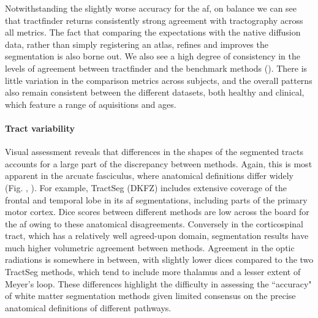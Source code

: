 Notwithstanding the slightly worse accuracy for the \gls{af}, on balance we can see that tractfinder returns consistently strong agreement with tractography across all metrics.
The fact that comparing the expectations with the native diffusion data, rather than simply registering an atlas, refines and improves the segmentation is also borne out. 
We also see a high degree of consistency in the levels of agreement between tractfinder and the benchmark methods ().
There is little variation in the comparison metrics across subjects, and the overall patterns also remain consistent between the different datasets, both healthy and clinical, which feature a range of aquisitions and ages.

\paragraph*{Tract variability}

Visual assessment reveals that  differences in the shapes of the segmented tracts accounts for a large part of the discrepancy between methods.
Again, this is most apparent in the arcuate fasciculus, where anatomical definitions differ widely (Fig. , ).
For example, TractSeg (DKFZ) includes extensive coverage of the frontal and temporal lobe in its \gls{af} segmentations, including parts of the primary motor cortex.
Dice scores between different methods are low across the board for the \gls{af} owing to these anatomical disagreements.
Conversely in the corticospinal tract, which has a relatively well agreed-upon domain, segmentation results have much higher volumetric agreement between methods. 
Agreement in the optic radiations is somewhere in between, with slightly lower \glspl{dice} compared to the two TractSeg methods, which tend to include more thalamus and a lesser extent of Meyer's loop.
These differences highlight the difficulty in assessing the ``accuracy" of white matter segmentation methods given limited consensus on the precise anatomical definitions of different pathways.


